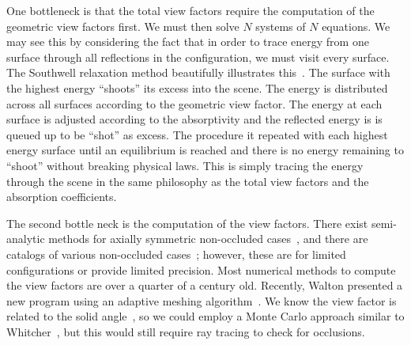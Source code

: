 One bottleneck is that the total view factors require the computation of
the geometric view factors first.  We must then solve \(N\) systems of
\(N\) equations.  We may see this by considering the fact that in order
to trace energy from one surface through all reflections in the
configuration, we must visit every surface.  The Southwell relaxation
method beautifully illustrates this~\cite{cohen_radiosity_1993}.  The
surface with the highest energy ``shoots'' its excess into the scene.
The energy is distributed across all surfaces according to the geometric
view factor.  The energy at each surface is adjusted according to the
absorptivity and the reflected energy is is queued up to be ``shot'' as
excess.  The procedure it repeated with each highest energy surface
until an equilibrium is reached and there is no energy remaining to
``shoot'' without breaking physical laws.  This is simply tracing the
energy through the scene in the same philosophy as the total view
factors and the absorption coefficients.

The second bottle neck is the computation of the view factors.  There
exist semi-analytic methods for axially symmetric non-occluded
cases~\cite{chung_simpler_1982, naraghi_radiation_1982,
chung_formulation_1984}, and there are catalogs of various non-occluded
cases~\cite{howell_catalog_2010}; however, these are for limited
configurations or provide limited precision.  Most numerical methods to
compute the view factors are over a quarter of a century old.  Recently,
Walton presented a new program using an adaptive meshing
algorithm~\cite{walton_calculation_2002}.  We know the view factor is
related to the solid angle~\cite{sparrow_new_1963}, so we could employ a
Monte Carlo approach similar to Whitcher~\cite{whitcher_monte_2012}, but
this would still require ray tracing to check for occlusions.

